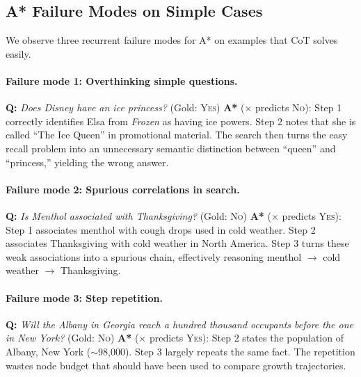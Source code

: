\documentclass[11pt]{article}
\begin{document}
{\subsection{A* Failure Modes on Simple Cases}
\label{app:astar_failures}

We observe three recurrent failure modes for A* on examples that CoT solves easily.

\paragraph{Failure mode 1: Overthinking simple questions.}

\begin{examplebox}[title=StrategyQA --- Overthinking]
\textbf{Q:} \emph{Does Disney have an ice princess?} \quad (Gold: \textsc{Yes})
\tcblower
\textbf{A*} ($\times$ predicts \textsc{No}): Step 1 correctly identifies Elsa from \emph{Frozen} as having ice powers. Step 2 notes that she is called ``The Ice Queen'' in promotional material. The search then turns the easy recall problem into an unnecessary semantic distinction between ``queen'' and ``princess,'' yielding the wrong answer.
\end{examplebox}

\paragraph{Failure mode 2: Spurious correlations in search.}

\begin{examplebox}[title=StrategyQA --- Spurious Correlation]
\textbf{Q:} \emph{Is Menthol associated with Thanksgiving?} \quad (Gold: \textsc{No})
\tcblower
\textbf{A*} ($\times$ predicts \textsc{Yes}): Step 1 associates menthol with cough drops used in cold weather. Step 2 associates Thanksgiving with cold weather in North America. Step 3 turns these weak associations into a spurious chain, effectively reasoning menthol $\rightarrow$ cold weather $\rightarrow$ Thanksgiving.
\end{examplebox}

\paragraph{Failure mode 3: Step repetition.}

\begin{examplebox}[title=StrategyQA --- Step Repetition]
\textbf{Q:} \emph{Will the Albany in Georgia reach a hundred thousand occupants before the one in New York?} \quad (Gold: \textsc{No})
\tcblower
\textbf{A*} ($\times$ predicts \textsc{Yes}): Step 2 states the population of Albany, New York ($\sim$98{,}000). Step 3 largely repeats the same fact. The repetition wastes node budget that should have been used to compare growth trajectories.
\end{examplebox}


}
\end{document}
